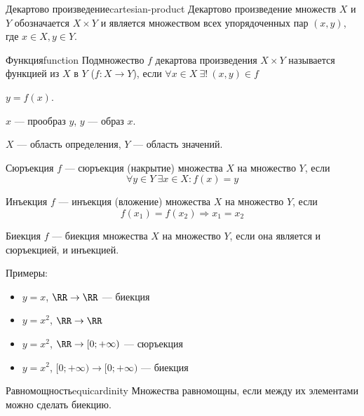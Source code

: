 \begin{defn}{Декартово произведение}{cartesian-product}
Декартово произведение множеств \( X \) и \( Y \) обозначается \( X \times Y \)
и является множеством всех упорядоченных пар \( (x, y) \), где \( x \in X, y \in Y \).
\end{defn}

\begin{defn}{Функция}{function}
Подмножество \( f \) декартова произведения \( X \times Y \)
называется функцией из \( X \) в \( Y \) (\(f : X \rightarrow Y \)),
если \( \forall x \in X \: \exists ! \ (x, y) \in f \)
\end{defn}

\newpage

\( y = f(x) \).

\( x \) --- прообраз \( y \), \( y \) --- образ \( x \).

\( X \) --- область определения, \( Y \) --- область значений.

\begin{defn}{Сюръекция}{}
    \( f \) --- сюръекция (накрытие) множества \( X \) на множество \( Y \), если
    \[
        \forall y \in Y \: \exists x \in X : f(x) = y
    \]
\end{defn}
\begin{defn}{Инъекция}{}
    \( f \) --- инъекция (вложение) множества \( X \) на множество \( Y \), если
    \[
        f(x_1) = f(x_2) \Rightarrow x_1 = x_2
    \]
\end{defn}
\begin{defn}{Биекция}{}
    \( f \) --- биекция множества \( X \) на множество \( Y \), если она является и сюръекцией, и инъекцией.
\end{defn}

Примеры:
\begin{itemize}
    \item
        \( y = x \), \( \RR \rightarrow \RR \) --- биекция
    \item
        \( y = x^2 \), \( \RR \rightarrow \RR \)
    \item
        \( y = x^2 \), \( \RR \rightarrow [0; +\infty) \) --- сюръекция
    \item
        \( y = x^2 \), \( [0; +\infty) \rightarrow [0; +\infty) \) --- биекция
\end{itemize}

\begin{defn}{Равномощность}{equicardinity}
    Множества равномощны, если между их элементами можно сделать биекцию.
\end{defn}

